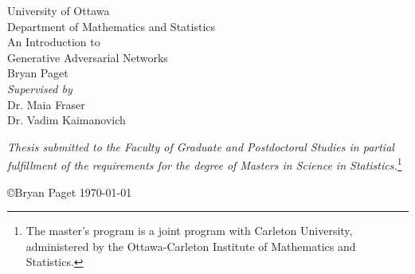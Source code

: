 \begin{titlepage}
  \scshape
  \begin{center}
    \LARGE
    University of Ottawa \\
    \small
    Department of Mathematics and Statistics \\
    \vspace{2.5cm}
    \Large
    An Introduction to \\
    \vspace{-0.3cm}
    \huge
    Generative Adversarial Networks \\
    \vspace{3cm}
    \Huge
    Bryan Paget \\
    \textit{
      \large
      Supervised by} \\
    \vspace{0.3cm}
    \Large Dr. Maia Fraser \\
    Dr. Vadim Kaimanovich \\

    \vspace{3cm}

    \small \textit{Thesis submitted to the Faculty of Graduate and
      Postdoctoral Studies in partial \\ fulfillment of the
      requirements for the degree of Masters in Science in
      Statistics.}\footnote{The master's program is a joint program
      with Carleton University, administered by the Ottawa-Carleton
      Institute of Mathematics and Statistics.}

    \vspace*{\fill}

    \small \copyright Bryan Paget \today

  \end{center}
\end{titlepage}

\afterpage{\null\blankpage}

